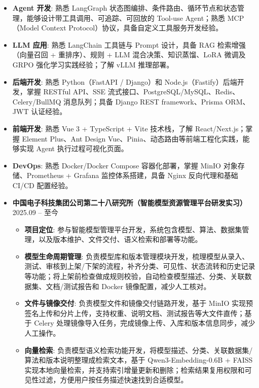 \documentclass[zh]{resume}
\begin{document}
\begin{itemize}
  \item \textbf{Agent 开发}: 熟悉 LangGraph 状态图编排、条件路由、循环节点和状态管理，能够设计带工具调用、可追踪、可回放的 Tool-use Agent；熟悉 MCP（Model Context Protocol）协议，具备自定义工具服务开发经验。
  \item \textbf{LLM 应用}: 熟悉 LangChain 工具链与 Prompt 设计，具备 RAG 检索增强（向量召回 + 重排序）、规则 + LLM 混合决策、知识蒸馏、LoRA 微调及 GRPO 强化学习实践经验；了解 vLLM 推理部署。
  \item \textbf{后端开发}: 熟悉 Python（FastAPI / Django）和 Node.js（Fastify）后端开发，掌握 RESTful API、SSE 流式接口、PostgreSQL/MySQL、Redis、Celery/BullMQ 消息队列；具备 Django REST framework、Prisma ORM、JWT 认证经验。
  \item \textbf{前端开发}: 熟悉 Vue 3 + TypeScript + Vite 技术栈，了解 React/Next.js；掌握 Element Plus、Ant Design Vue、Pinia、动态路由等前端工程化实践，能够实现 Agent 执行过程可视化页面。
  \item \textbf{DevOps}: 熟悉 Docker/Docker Compose 容器化部署，掌握 MinIO 对象存储、Prometheus + Grafana 监控体系搭建，具备 Nginx 反向代理和基础 CI/CD 配置经验。
\end{itemize}

\begin{itemize}
  \item \textbf{中国电子科技集团公司第二十八研究所（智能模型资源管理平台研发实习）} \hfill 2025.09 -- 至今
  \begin{itemize}
    \item \textbf{项目定位}: 参与智能模型管理平台开发，系统包含模型、算法、数据集管理，以及版本维护、文件交付、语义检索和部署等功能。
    \item \textbf{模型生命周期管理}: 负责模型库和版本管理模块开发，梳理模型从录入、测试、审核到上架/下架的流程，补齐分类、可见性、状态流转和历史记录等功能；将上架前检查做成规则校验，自动检查模型描述、分类、关联数据集、文档/测试报告和 Docker 镜像配置，减少人工核对。
    \item \textbf{文件与镜像交付}: 负责模型文件和镜像交付链路开发，基于 MinIO 实现预签名上传和分片上传，支持权重、说明文档、测试报告等大文件直传；基于 Celery 处理镜像导入任务，完成镜像上传、入库和版本信息同步，减少人工操作。
    \item \textbf{向量检索}: 负责模型语义检索功能开发，将模型描述、分类、关联数据集/算法和版本说明整理成检索文本，基于 Qwen3-Embedding-0.6B + FAISS 实现本地向量检索，并支持索引增量更新和删除；检索结果复用权限和可见性过滤，方便用户按任务描述快速找到合适模型。
  \end{itemize}
\end{itemize}
\end{document}
